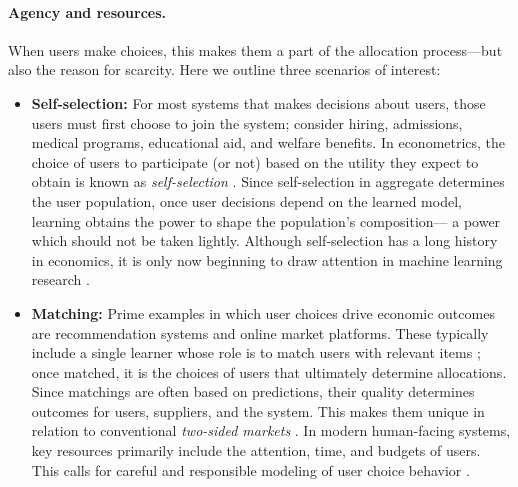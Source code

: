 \paragraph{Agency and resources.}
When users make choices, 
this makes them a part of the allocation process---but also the reason for scarcity.
Here we outline three scenarios of interest:
\squeeze
\squeeze
\begin{itemize}[leftmargin=1em,topsep=0em,itemsep=0.2em]
\item 
\textbf{Self-selection:}
For most systems that makes decisions about users,
those users must first choose to join the system;
consider hiring, admissions, medical programs, educational aid,
and welfare benefits.
In econometrics, the choice of users to participate (or not)
based on the utility they expect to obtain
is known as \emph{self-selection} \citep{roy1951some}.
Since self-selection in aggregate determines the user population,
once user decisions depend on the learned model,
learning obtains the power to shape the population's composition---%
a power which should not be taken lightly.%
Although self-selection has a long history in economics,
it is only now beginning to draw attention in machine learning research \citep{zhang2021classification,cherapanamjeri2023makes,horowitz2024classification}.




\item
\textbf{Matching:}
Prime examples in which user choices drive economic outcomes are recommendation systems and online market platforms.
These typically include a single learner whose role is
to match users with relevant items \citep{jagadeesan2023learning};
once matched, it is the choices of users that ultimately determine allocations.
Since matchings are often based on predictions,
their quality determines outcomes for users, suppliers, and the system. %
This makes them unique in relation to conventional \emph{two-sided markets}  \citep{rochet2003platform}.
In modern human-facing systems, key resources primarily include the attention, time, and budgets of users.
This calls for careful and responsible modeling of user choice behavior
\citep{kleinberg2024challenge}.%


\end{itemize}
